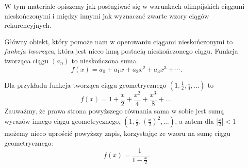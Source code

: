\documentclass[shortabstract]{imthesis}
\begin{document}
W tym materiale opiszemy jak posługiwać się w warunkach olimpijskich ciągami nieskończonymi i między innymi jak wyznaczać zwarte wzory ciągów rekurencyjnych.

Główny obiekt, który pomoże nam w operowaniu ciągami nieskończonymi to \emph{funkcja tworząca}, która jest nieco inną postacią nieskończonego ciągu. Funkcja tworząca ciągu $(a_n)$ to nieskończona suma
$$
f(x) = a_0 + a_1x + a_2x^2 + a_3x^3 + \cdots.
$$

Dla przykładu funkcja tworząca ciągu geometrycznego $(1, \frac12, \frac14, \ldots)$ to
$$
f(x) = 1 + \frac{x}{2} + \frac{x^2}{4} + \frac{x^3}{8} + \ldots.
$$
Zauważmy, że prawa strona powyższego równania sama w sobie jest sumą wyrazów innego ciągu geometrycznego, $\left(1, \frac{x}{2}, \left(\frac{x}{2}\right)^2, \ldots\right)$, a zatem dla $\left|\frac{x}{2}\right| < 1$ możemy nieco uprościć powyższy zapis, korzystając ze wzoru na sumę ciągu geometrycznego:
$$
f(x) = \frac{1}{1 - \frac{x}{2}}.
$$
\end{document}
